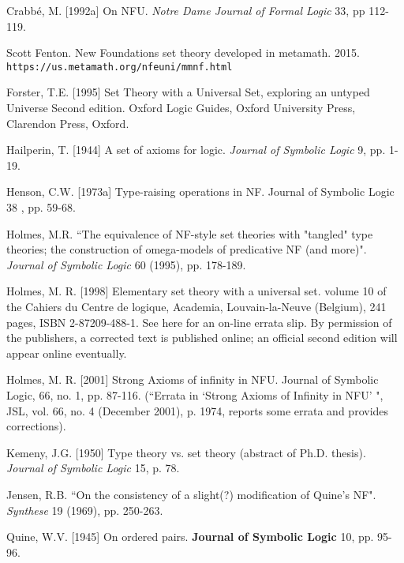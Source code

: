 \documentclass{article}
\theoremstyle{definition}
\theoremstyle{remark}
\begin{document}
\newpage

\begin{thebibliography}{99}


  Crabb\'{e}, M. [1992a]
On NFU.
{\em Notre Dame Journal of Formal Logic\/} 33, pp 112-119.

  Scott Fenton.  New Foundations set theory developed in metamath.  2015.  {\tt https://us.metamath.org/nfeuni/mmnf.html}

  Forster, T.E. [1995]
Set Theory with a Universal Set, exploring an untyped Universe
Second edition. Oxford Logic Guides, Oxford University Press, Clarendon Press, Oxford.

 Hailperin, T. [1944]
A set of axioms for logic.
{\em Journal of Symbolic Logic\/} 9, pp. 1-19.



   Henson, C.W. [1973a]
Type-raising operations in NF.
Journal of Symbolic Logic 38 , pp. 59-68.

  Holmes, M.R.
``The equivalence of NF-style set theories with "tangled" type theories; the construction of omega-models of predicative NF (and more)".
{\em Journal of Symbolic Logic\/} 60 (1995), pp. 178-189.

  Holmes, M. R. [1998]
Elementary set theory with a universal set.
volume 10 of the Cahiers du Centre de logique, Academia, Louvain-la-Neuve (Belgium), 241 pages, ISBN 2-87209-488-1. See here for an on-line errata slip. By permission of the publishers, a corrected text is published online; an official second edition will appear online eventually.

   Holmes, M. R. [2001]
Strong Axioms of infinity in NFU.
Journal of Symbolic Logic, 66, no. 1, pp. 87-116.  \newline(``Errata in `Strong
Axioms of Infinity in NFU' ", JSL, vol. 66, no. 4 (December
2001), p. 1974, reports some errata and provides corrections).

  Kemeny, J.G. [1950]
Type theory vs. set theory (abstract of Ph.D. thesis).
{\em Journal of Symbolic Logic\/} 15, p. 78.

  Jensen, R.B.
``On the consistency of a slight(?) modification of Quine's NF".
{\em Synthese\/} 19 (1969), pp. 250-263.

  Quine, W.V. [1945]
On ordered pairs.
{\bf Journal of Symbolic Logic\/} 10, pp. 95-96.


\end{thebibliography}
\end{document}
